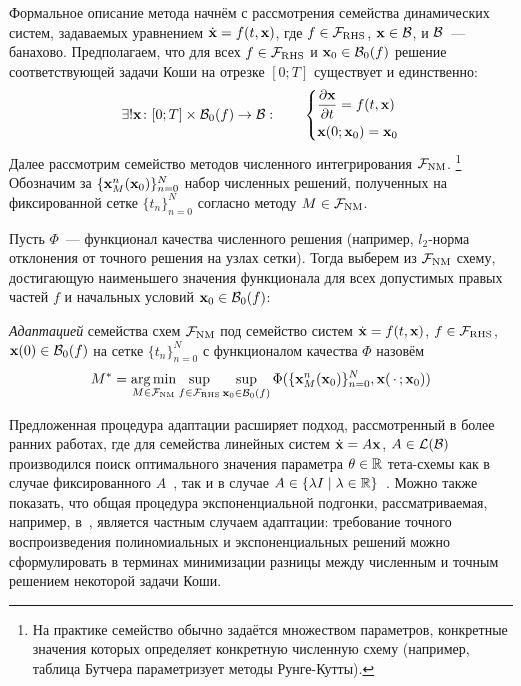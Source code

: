 Формальное описание метода начнём с рассмотрения семейства динамических систем,
задаваемых уравнением $ \dot{\mathbf{x}} = f(t, \mathbf{x}) $,
где $ f \in \mathcal{F}_{\textnormal{RHS}} $, $ \mathbf{x} \in \mathcal{B} $, и $ \mathcal{B} $~--- банахово.
Предполагаем, что для всех $ f \in \mathcal{F}_{\textnormal{RHS}} $ и $ \mathbf{x}_0 \in \mathcal{B}_0(f) $ решение соответствующей задачи Коши
на отрезке $ [0; T] $ существует и единственно:
\[
    \exists! \mathbf{x} \colon [0; T] \times \mathcal{B}_0(f) \to \mathcal{B}: \qquad
    \begin{dcases}
        \frac{\partial \mathbf{x}}{\partial t} = f(t, \mathbf{x}) \\
        \mathbf{x}(0; \mathbf{x}_0) = \mathbf{x}_0
    \end{dcases}
\]
Далее рассмотрим семейство методов численного интегрирования $ \mathcal{F}_{\textnormal{NM}} $.%
\footnote{На практике семейство обычно задаётся множеством параметров,
конкретные значения которых определяет конкретную численную схему
(например, таблица Бутчера параметризует методы Рунге-Кутты).}
Обозначим за $ \{ \mathbf{x}_M^n(\mathbf{x}_0) \}_{n=0}^{N} $ набор численных решений,
полученных на фиксированной сетке $ \{ t_n \}_{n=0}^N $ согласно методу $ M \in \mathcal{F}_{\textnormal{NM}} $.

Пусть $ \Phi $~--- функционал качества численного решения
(например, $ l_2 $-норма отклонения от точного решения на узлах сетки).
Тогда выберем из $ \mathcal{F}_{\textnormal{NM}} $ схему,
достигающую наименьшего значения функционала
для всех допустимых правых частей $ f $ и начальных условий $ \mathbf{x}_0 \in \mathcal{B}_0(f) $:

\begin{definition}
    \label{definition:adaptation_method:adapted_numerical_method}
    \emph{Адаптацией} семейства схем $ \mathcal{F}_{\textnormal{NM}} $ под семейство систем $ \dot{\mathbf{x}} = f(t, \mathbf{x}) $,
    $ f \in \mathcal{F}_{\textnormal{RHS}} $, $ \mathbf{x}(0) \in \mathcal{B}_0(f) $ на сетке $ \{ t_n \}_{n=0}^N $ с функционалом качества $ \Phi $
    назовём
    \begin{equation}
        \label{eq:adaptation_method:adapted_numerical_method}
        M^* = \operatorname*{\arg\min}_{M \in \mathcal{F}_{\textnormal{NM}}} \sup_{f \in \mathcal{F}_{\textnormal{RHS}}} \sup_{\mathbf{x}_0 \in \mathcal{B}_0(f)} \Phi(\{ \mathbf{x}_M^n(\mathbf{x}_0) \}_{n=0}^N, \mathbf{x}(\,\cdot\,; \mathbf{x}_0) )
    \end{equation}
\end{definition}

Предложенная процедура адаптации расширяет подход, рассмотренный в более ранних работах,
где для семейства линейных систем $ \dot{\mathbf{x}} = A \mathbf{x} $, $ A \in \mathcal{L}(\mathcal{B}) $
производился поиск оптимального значения параметра $ \theta \in \mathbb{R} $ тета-схемы
как в случае фиксированного $ A $~\cite{liniger1970efficient_integration_methods, lambert1991methods, berzins1992adaptive_theta_method},
так и в случае $ A \in \{ \lambda I \mid \lambda \in \mathbb{R} \} $~\cite{liniger1969global_accuracy, johnson1988tunable_integration_method}.
Можно также показать, что общая процедура экспоненциальной подгонки, рассматриваемая,
например, в~\cite{hollevoet2013exponential_fitting}, является частным случаем адаптации:
требование точного воспроизведения полиномиальных и экспоненциальных решений
можно сформулировать в терминах минимизации разницы между численным и точным решением некоторой задачи Коши.

